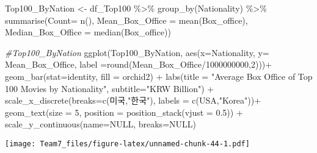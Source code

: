 \documentclass[
]{article}
\newenvironment{Shaded}{\begin{snugshade}}{\end{snugshade}}
\newcommand{\AttributeTok}[1]{\textcolor[rgb]{0.77,0.63,0.00}{#1}}
\newcommand{\CommentTok}[1]{\textcolor[rgb]{0.56,0.35,0.01}{\textit{#1}}}
\newcommand{\ConstantTok}[1]{\textcolor[rgb]{0.00,0.00,0.00}{#1}}
\newcommand{\DecValTok}[1]{\textcolor[rgb]{0.00,0.00,0.81}{#1}}
\newcommand{\FloatTok}[1]{\textcolor[rgb]{0.00,0.00,0.81}{#1}}
\newcommand{\FunctionTok}[1]{\textcolor[rgb]{0.00,0.00,0.00}{#1}}
\newcommand{\NormalTok}[1]{#1}
\newcommand{\OtherTok}[1]{\textcolor[rgb]{0.56,0.35,0.01}{#1}}
\newcommand{\SpecialCharTok}[1]{\textcolor[rgb]{0.00,0.00,0.00}{#1}}
\newcommand{\StringTok}[1]{\textcolor[rgb]{0.31,0.60,0.02}{#1}}
\begin{document}
\begin{Shaded}
\begin{Highlighting}[]
\NormalTok{Top100\_ByNation }\OtherTok{\textless{}{-}}\NormalTok{ df\_Top100 }\SpecialCharTok{\%\textgreater{}\%}
  \FunctionTok{group\_by}\NormalTok{(Nationality) }\SpecialCharTok{\%\textgreater{}\%}
  \FunctionTok{summarise}\NormalTok{(}\AttributeTok{Count=} \FunctionTok{n}\NormalTok{(), }\AttributeTok{Mean\_Box\_Office =} \FunctionTok{mean}\NormalTok{(Box\_office), }\AttributeTok{Median\_Box\_Office =} \FunctionTok{median}\NormalTok{(Box\_office))}
\end{Highlighting}
\end{Shaded}

\begin{Shaded}
\begin{Highlighting}[]
\CommentTok{\#Top100\_ByNation}
\FunctionTok{ggplot}\NormalTok{(Top100\_ByNation, }
       \FunctionTok{aes}\NormalTok{(}\AttributeTok{x=}\NormalTok{Nationality, }\AttributeTok{y=}\NormalTok{ Mean\_Box\_Office, }
           \AttributeTok{label =}\FunctionTok{round}\NormalTok{(Mean\_Box\_Office}\SpecialCharTok{/}\DecValTok{1000000000}\NormalTok{,}\DecValTok{2}\NormalTok{)))}\SpecialCharTok{+}
  \FunctionTok{geom\_bar}\NormalTok{(}\AttributeTok{stat=}\StringTok{\textquotesingle{}identity\textquotesingle{}}\NormalTok{, }\AttributeTok{fill =} \StringTok{\textquotesingle{}orchid2\textquotesingle{}}\NormalTok{) }\SpecialCharTok{+}
  \FunctionTok{labs}\NormalTok{(}\AttributeTok{title =} \StringTok{"Average Box Office of Top 100 Movies by Nationality"}\NormalTok{,}
          \AttributeTok{subtitle=}\StringTok{"KRW Billion"}\NormalTok{) }\SpecialCharTok{+}
  \FunctionTok{scale\_x\_discrete}\NormalTok{(}\AttributeTok{breaks=}\FunctionTok{c}\NormalTok{(}\StringTok{\textquotesingle{}미국\textquotesingle{}}\NormalTok{,}\StringTok{"한국"}\NormalTok{), }\AttributeTok{labels =} \FunctionTok{c}\NormalTok{(}\StringTok{\textquotesingle{}USA\textquotesingle{}}\NormalTok{,}\StringTok{"Korea"}\NormalTok{))}\SpecialCharTok{+}
  \FunctionTok{geom\_text}\NormalTok{(}\AttributeTok{size =} \DecValTok{5}\NormalTok{, }\AttributeTok{position =} \FunctionTok{position\_stack}\NormalTok{(}\AttributeTok{vjust =} \FloatTok{0.5}\NormalTok{)) }\SpecialCharTok{+}
  \FunctionTok{scale\_y\_continuous}\NormalTok{(}\AttributeTok{name=}\ConstantTok{NULL}\NormalTok{, }\AttributeTok{breaks=}\ConstantTok{NULL}\NormalTok{)}
\end{Highlighting}
\end{Shaded}

\texttt{[image: Team7\_files/figure-latex/unnamed-chunk-44-1.pdf]}
\end{document}
